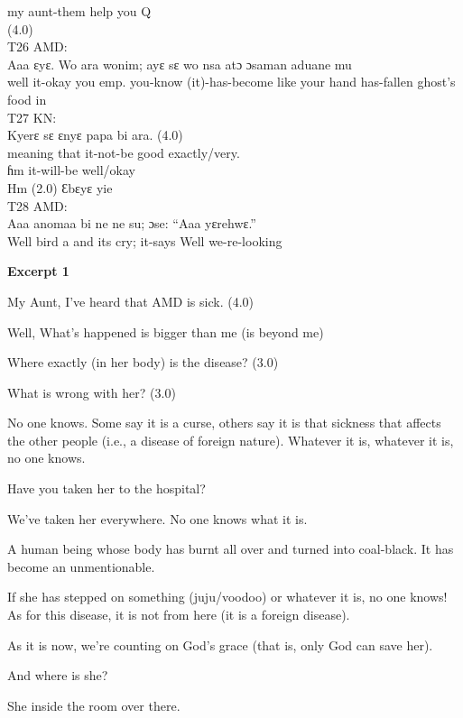\documentclass[output=paper,colorlinks,citecolor=brown]{langscibook}
\begin{document}
            my aunt-them help you Q\\
            (4.0)\\
\ex%
    T26 AMD:\\
    \gll    Aaa ɛyɛ. Wo ara wonim; ayɛ sɛ wo nsa atɔ ɔsaman aduane mu \\
            well it-okay you emp. you-know (it)-has-become like your hand has-fallen ghost’s food in\\
\ex%
    T27 KN:\\
    \ea
    \gll    Kyerɛ sɛ ɛnyɛ papa bi ara. (4.0) \\
            meaning that it-not-be good exactly/very. \\ 
    \ex     
    \gll    ɦm it-will-be well/okay\\
            Hm (2.0) Ɛbɛyɛ yie\\
    \z
\ex%
    T28 AMD:\\
    \gll    Aaa anomaa bi ne ne su; ɔse: “Aaa yɛrehwɛ.”\\
            Well bird a and its cry; it-says Well we-re-looking \\
\z

\noindent \textbf{Excerpt 1}

\begin{description}[style=unboxed,font=\normalfont]
    \item[T1 KN:] My Aunt, I’ve heard that AMD is sick. (4.0)
    \item[T2 AB:] Well, What’s happened is bigger than me (is beyond me)
    \item[T3 KN:] Where exactly (in her body) is the disease? (3.0) 
    \item[T4 KN:] What is wrong with her? (3.0)
    \item[T5 AB:] No one knows. Some say it is a curse, others say it is that sickness that affects the other people (i.e., a disease of foreign nature). Whatever it is, whatever it is, no one knows.
    \item[T6 KN:] Have you taken her to the hospital?
    \item[T7 AB:] We’ve taken her everywhere. No one knows what it is.
    \item[T8 AG:] A human being whose body has burnt all over and turned into coal-black. It has become an unmentionable.
    \item[T9 AB:] If she has stepped on something (juju/voodoo) or whatever it is, no one knows! As for this disease, it is not from here (it is a foreign disease).
    \item[T10 AG:] As it is now, we’re counting on God’s grace (that is, only God can save her).
    \item[T11 KN:] And where is she?
    \item[T12 AB:] She inside the room over there.
\end{description}
\end{document}
